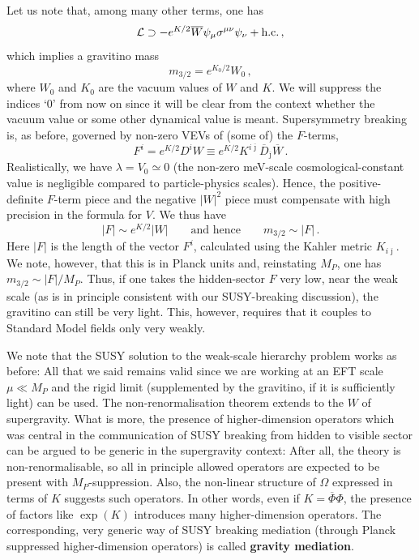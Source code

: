\documentclass[12pt]{article}
\newcommand{\be}{\begin{equation}}
\newcommand{\ee}{\end{equation}}
\newcommand{\ol}{\overline}
\numberwithin{equation}{section}
\begin{document}
Let us note that, among many other terms, one has
\be
{\cal L}\supset -e^{K/2}\ol{W}\psi_\mu\sigma^{\mu\nu}\psi_\nu+\mbox{h.c.}\,,
\ee
which implies a gravitino mass
\be
m_{3/2}=e^{K_0/2}W_0\,,
\ee
where $W_0$ and $K_0$ are the vacuum values of $W$ and $K$. We will suppress the indices `0' from now on since it will be clear from the context whether the vacuum value or some other dynamical value is meant. Supersymmetry breaking is, as before, governed by non-zero VEVs of (some of) the $F$-terms,
\be
F^i=e^{K/2}D^iW \equiv e^{K/2}K^{i\ol{\jmath}}\ol{D}_{\ol{\jmath}}\ol{W}\,.
\ee
Realistically, we have $\lambda=V_0\simeq 0$ (the non-zero meV-scale cosmological-constant value is negligible compared to particle-physics scales). Hence, the positive-definite $F$-term piece and the negative $|W|^2$ piece must compensate with high precision in the formula for $V$. We thus have
\be
|F|\sim e^{K/2}|W| \qquad \mbox{and hence}\qquad m_{3/2}\sim |F|\,.
\ee
Here $|F|$ is the length of the vector $F^i$, calculated using the Kahler metric $K_{i\ol{\jmath}}$. We note, however, that this is in Planck units and, reinstating $M_P$, one has $m_{3/2}\sim |F|/M_P$. Thus, if one takes the hidden-sector $F$ very low, near the weak scale (as is in principle consistent with our SUSY-breaking discussion), the gravitino can still be very light. This, however, requires that it couples to Standard Model fields only very weakly. 

We note that the SUSY solution to the weak-scale hierarchy problem works as before: All that we said remains valid since we are working at an EFT scale $\mu\ll M_P$ and the rigid limit (supplemented by the gravitino, if it is sufficiently light) can be used. The non-renormalisation theorem extends to the $W$ of supergravity. What is more, the presence of higher-dimension operators which was central in the communication of SUSY breaking from hidden to visible sector can be argued to be generic in the supergravity context: After all, the theory is non-renormalisable, so all in principle allowed operators are expected to be present with $M_P$-suppression. Also, the non-linear structure of $\Omega$ expressed in terms of $K$ suggests such operators. In other words, even if $K=\ol{\Phi}\Phi$, the presence of factors like $\exp(K)$ introduces many higher-dimension operators. The corresponding, very generic way of SUSY breaking mediation (through Planck suppressed higher-dimension operators) is called {\bf gravity mediation}.
\end{document}
